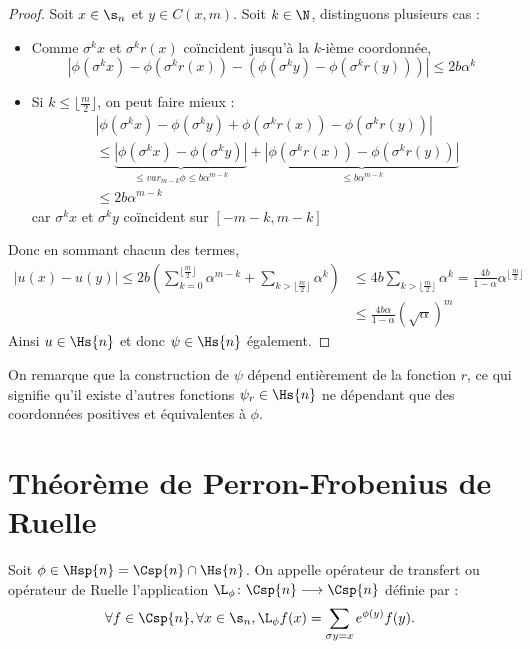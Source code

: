 \begin{proof}
    Soit $x \in \s_n$ et $y \in C(x, m)$. Soit $k \in \N$, distinguons plusieurs cas :
    \begin{itemize}
      \item Comme $\sigma^kx$ et $\sigma^kr(x)$ coïncident jusqu'à la $k$-ième coordonnée,
	$$\left|\phi(\sigma^kx) - \phi(\sigma^kr(x)) - (\phi(\sigma^ky) - \phi(\sigma^kr(y)))\right|
	      \leq 2b\alpha^k$$
      \item Si $k \leq \lfloor\frac m 2\rfloor$, on peut faire mieux :
	\begin{align*}
	  &\left|\phi(\sigma^kx) - \phi(\sigma^ky) + \phi(\sigma^kr(x)) - \phi(\sigma^kr(y)) \right| \\
	  &\leq \underbrace{\left|\phi(\sigma^kx) - \phi(\sigma^ky)\right|}_{\leq var_{m-k}\phi \leq b\alpha^{m-k}}
	  + \underbrace{\left|\phi(\sigma^kr(x)) - \phi(\sigma^kr(y))\right|}_{\leq b\alpha^{m-k}} \\
	  &\leq 2b\alpha^{m-k}
	\end{align*}
	car $\sigma^kx$ et $\sigma^ky$ coïncident sur $[-m - k, m - k]$
    \end{itemize}
    Donc en sommant chacun des termes,
    \begin{align*}
      \left|u(x) - u(y)\right|
	    \leq 2b\left(\sum_{k=0}^{\lfloor\frac m 2\rfloor}{\alpha^{m - k}} + \sum_{k > \lfloor \frac m 2 \rfloor}{\alpha^k}\right)
	    &\leq 4b\sum_{k > \lfloor \frac m 2 \rfloor}{\alpha^k} = \frac{4b}{1-\alpha}\alpha^{\lfloor\frac m 2\rfloor} \\
	    &\leq \frac{4b\alpha}{1 - \alpha}(\sqrt{\alpha})^m
    \end{align*}
    Ainsi $u \in \Hs{n}$ et donc $\psi \in \Hs{n}$ également.
  \end{proof}

  \begin{remark}
    On remarque que la construction de $\psi$ dépend entièrement de la fonction $r$, ce qui signifie qu'il existe d'autres fonctions $\psi_r \in \Hs{n}$
    ne dépendant que des coordonnées positives et équivalentes à $\phi$.
  \end{remark}


\section{Théorème de Perron-Frobenius de Ruelle}

  \begin{definition}
    \label{def:transfert_operator}
    \leanok
    Soit $\phi \in \Hsp{n} = \Csp{n} \cap \Hs{n}$. On appelle opérateur de transfert ou opérateur de Ruelle l'application
    $\L_{\phi} \colon \Csp{n} \longrightarrow \Csp{n} $ définie par :
    $$ \forall f \in \Csp{n}, \forall x \in \s_n, \L_{\phi}f(x) = \sum_{\sigma y = x}{e^{\phi(y)}f(y)}.$$
  \end{definition}

